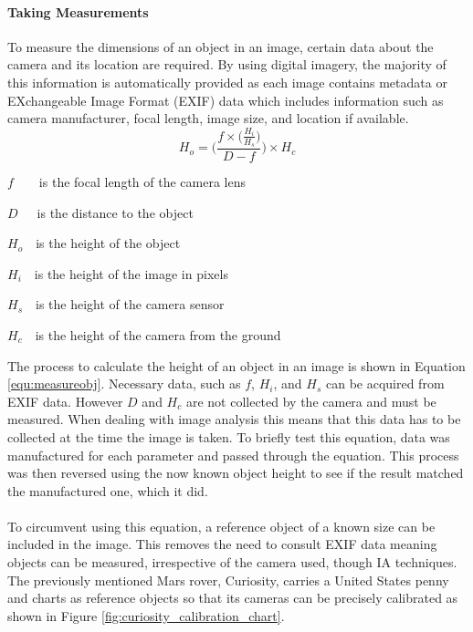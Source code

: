 	\paragraph{Taking Measurements}\label{sec:taking_measurements}
		To measure the dimensions of an object in an image, certain data about the camera and its location are required. By using digital imagery, the majority of this information is automatically provided as each image contains metadata or EXchangeable Image Format (EXIF) data which includes information such as camera manufacturer, focal length, image size, and location if available.
	\begin{equation}
		\label{equ:measureobj}
		H_{o} = \Bigg(\frac{f\times\big(\frac{H_{i}}{H_{s}}\big)}{D - f}\Bigg)\times H_{c}
	\end{equation}
	\begin{where}
		\item $f$~~~~is the focal length of the camera lens
		\item $D$~~~is the distance to the object
		\item $H_{o}$~~is the height of the object
		\item $H_{i}$~~is the height of the image in pixels
		\item $H_{s}$~~is the height of the camera sensor
		\item $H_{c}$~~is the height of the camera from the ground
	\end{where}
	\vspace{5mm}
	The process to calculate the height of an object in an image is shown in Equation \ref{equ:measureobj}. Necessary data, such as $f$, $H_i$, and $H_s$ can be acquired from EXIF data. However $D$ and $H_c$ are not collected by the camera and must be measured. When dealing with image analysis this means that this data has to be collected at the time the image is taken. To briefly test this equation, data was manufactured for each parameter and passed through the equation. This process was then reversed using the now known object height to see if the result matched the manufactured one, which it did.
	\\\\
	To circumvent using this equation, a reference object of a known size can be included in the image. This removes the need to consult EXIF data meaning objects can be measured, irrespective of the camera used, though IA techniques. The previously mentioned Mars rover, Curiosity, carries a United States penny and charts as reference objects so that its cameras can be precisely calibrated as shown in Figure \ref{fig:curiosity_calibration_chart}.

